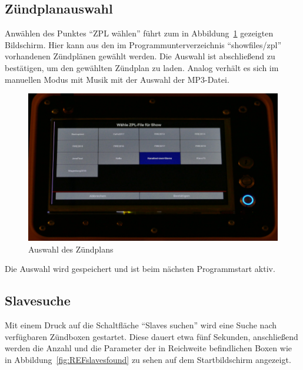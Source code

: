 \documentclass[paper=a4, parskip, numbers=noenddot, toc=listof, headsepline]{scrbook}
\begin{document}
			\subsection{Zündplanauswahl}

				Anwählen des Punktes \enquote{ZPL wählen} führt zum in Abbildung~\ref{fig:REFzplwahl} gezeigten Bildschirm. Hier kann aus den im Programmunterverzeichnis \enquote{showfiles/zpl} vorhandenen Zündplänen gewählt werden. Die Auswahl ist abschließend zu bestätigen, um den gewählten Zündplan zu laden. Analog verhält es sich im manuellen Modus mit Musik mit der Auswahl der MP3-Datei.

				\begin{figure}
					\centering\includegraphics[width=150mm]{Bilder/REFzplwahl}
					\caption{Auswahl des Zündplans}
					\label{fig:REFzplwahl}
				\end{figure}

				Die Auswahl wird gespeichert und ist beim nächsten Programmstart aktiv.
				
			\subsection{Slavesuche}
			
				Mit einem Druck auf die Schaltfläche \enquote{Slaves suchen} wird eine Suche nach verfügbaren Zündboxen gestartet. Diese dauert etwa fünf Sekunden, anschließend werden die Anzahl und die Parameter der in Reichweite befindlichen Boxen wie in Abbildung~\ref{fig:REFslavesfound} zu sehen auf dem Startbildschirm angezeigt.
				
\end{document}
